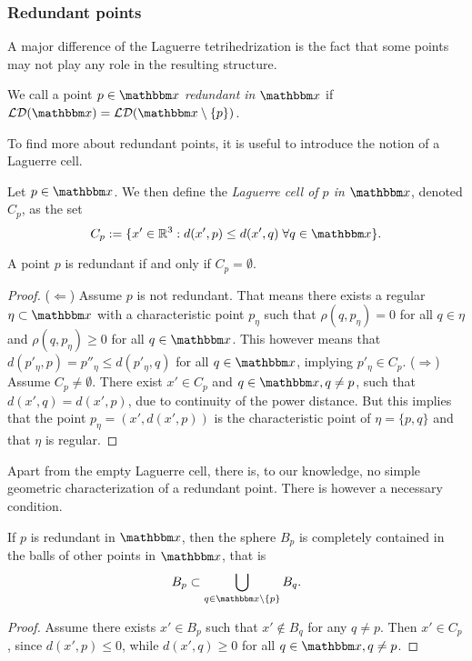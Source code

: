 \begin{remark}\label{rem:LaguerreToDelaunay}
\tbd
\end{remark}


\subsubsection{Redundant points}

A major difference of the Laguerre tetrihedrization is the fact that some points may not play any role in the resulting structure.

\begin{definition}
	We call a point $p \in \x$ \textit{redundant in} $\x$ if $\mathcal {LD}(\x) = \mathcal {LD}(\x \setminus \{p\})$.
\end{definition}

To find more about redundant points, it is useful to introduce the notion of a Laguerre cell.

\begin{definition}
Let $p\in \x$. We then define the \textit{Laguerre cell of $p$ in $\x$}, denoted $C_p$, as the set
$$C_p := \{x' \in \Rt: d(x',p) \leq d(x',q) \; \forall q \in \x\}.$$ 
\end{definition}

\begin{proposition}
	A point $p$ is redundant if and only if $C_p=\emptyset$.
\end{proposition}
\begin{proof}
	($\Leftarrow$) Assume $p$ is not redundant. That means there exists a regular $\eta\subset \x$ with a characteristic point $p_\eta$ such that $\rho(q,p_\eta)=0$ for all $q\in\eta$ and $\rho(q,p_\eta)\geq 0$ for all $q\in \x$. This however means that $d(p'_\eta,p) = p''_\eta \leq d(p'_\eta,q)$ for all $q\in\x$, implying $p'_\eta \in C_p$. \newline
	($\Rightarrow$) Assume $C_p \neq \emptyset$. There exist $x' \in C_p$ and $q\in\x, q\neq p$, such that $d(x',q)=d(x',p)$, due to continuity of the power distance. But this implies that the point $p_\eta = (x', d(x',p))$ is the characteristic point of $\eta=\{p,q\}$ and that $\eta$ is regular.
\end{proof}

Apart from the empty Laguerre cell, there is, to our knowledge, no simple geometric characterization of a redundant point. There is however a necessary condition.

\begin{proposition}
	If $p$ is redundant in $\x$, then the sphere $B_p$ is completely contained in the balls of other points in $\x$, that is 
	$$B_p \subset \bigcup_{q \in \x\setminus \{p\}} B_q.$$
\end{proposition}
\begin{proof}
	Assume there exists $x' \in B_p$ such that $x' \notin B_q$ for any $q\neq p$. Then $x' \in C_p$, since $d(x', p) \leq 0$, while $d(x',q) \geq 0$ for all $q\in \x, q\neq p$.
\end{proof}


